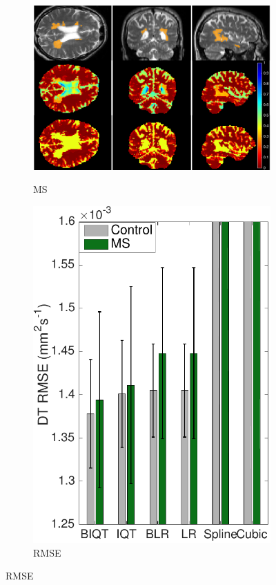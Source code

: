 	\begin{figure}[ht]
		\centering
		\begin{subfigure}{0.50\linewidth}
			\caption{MS}
			\includegraphics[width=\textwidth]{chapter_2/figure_6.png}
			\label{fig:map1}
		\end{subfigure}
		\begin{subfigure}{0.245\linewidth}
			\caption{RMSE}
			\includegraphics[width=\textwidth]{chapter_2/figure_7.pdf}

\end{subfigure}
\end{figure}
